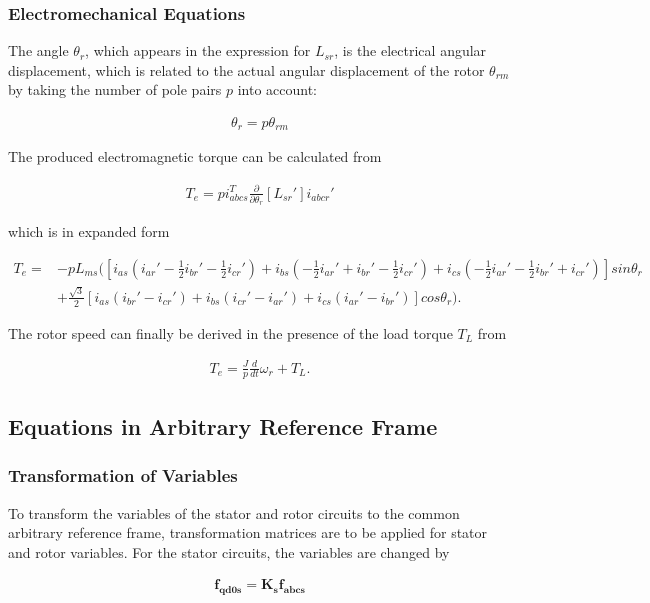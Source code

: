 \begin{flushleft}
\subsubsection{Electromechanical Equations}
The angle $\theta_r$, which appears in the expression for $L_{sr}$, is the electrical angular displacement, which is related to the actual angular displacement of the rotor $\theta_{rm}$ by taking the number of pole pairs $p$ into account:

\begin{align*}
\theta_r = p\theta_{rm}
\end{align*}

The produced electromagnetic torque can be calculated from

\begin{align*}
T_e = pi_{abcs}^T\frac{\partial}{\partial \theta_r}[L_{sr}']i_{abcr}'
\end{align*}

which is in expanded form

\begin{align*}
T_e = & -pL_{ms}([i_{as}(i_{ar}'-\frac{1}{2}i_{br}'-\frac{1}{2}i_{cr}')+i_{bs}(-\frac{1}{2}i_{ar}'+i_{br}'-\frac{1}{2}i_{cr}')+i_{cs}(-\frac{1}{2}i_{ar}'-\frac{1}{2}i_{br}'+i_{cr}')]sin \theta_r \\
& + \frac{\sqrt{3}}{2}[i_{as}(i_{br}'-i_{cr}')+i_{bs}(i_{cr}'-i_{ar}')+i_{cs}(i_{ar}'-i_{br}')]cos \theta_r).
\end{align*}

The rotor speed can finally be derived in the presence of the load torque $T_L$ from 

\begin{align*}
T_e = \frac{J}{p}\frac{d}{dt}\omega_r + T_L.
\end{align*}

\newpage
\subsection{Equations in Arbitrary Reference Frame}
\subsubsection{Transformation of Variables}
To transform the variables of the stator and rotor circuits to the common arbitrary reference frame, transformation matrices are to be applied for stator and rotor variables. For the stator circuits, the variables are changed by 

\begin{align*}
\mathbf{f_{qd0s}} = \mathbf{K_{s}}\mathbf{f_{abcs}}
\end{align*}


\end{flushleft}
